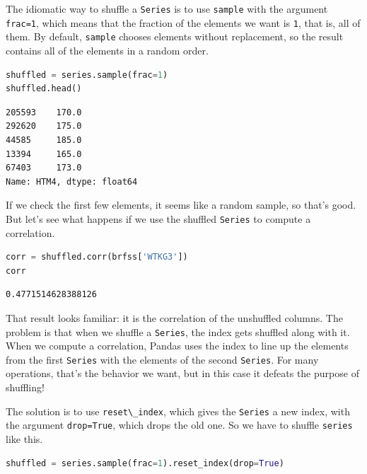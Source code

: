 The idiomatic way to shuffle a \passthrough{\lstinline!Series!} is to
use \passthrough{\lstinline!sample!} with the argument
\passthrough{\lstinline!frac=1!}, which means that the fraction of the
elements we want is \passthrough{\lstinline!1!}, that is, all of them.
By default, \passthrough{\lstinline!sample!} chooses elements without
replacement, so the result contains all of the elements in a random
order.

\begin{lstlisting}[language=Python,style=source]
shuffled = series.sample(frac=1)
shuffled.head()
\end{lstlisting}

\begin{lstlisting}[style=output]
205593    170.0
292620    175.0
44585     185.0
13394     165.0
67403     173.0
Name: HTM4, dtype: float64
\end{lstlisting}

If we check the first few elements, it seems like a random sample, so
that's good. But let's see what happens if we use the shuffled
\passthrough{\lstinline!Series!} to compute a correlation.

\begin{lstlisting}[language=Python,style=source]
corr = shuffled.corr(brfss['WTKG3'])
corr
\end{lstlisting}

\begin{lstlisting}[style=output]
0.4771514628388126
\end{lstlisting}

That result looks familiar: it is the correlation of the unshuffled
columns. The problem is that when we shuffle a
\passthrough{\lstinline!Series!}, the index gets shuffled along with it.
When we compute a correlation, Pandas uses the index to line up the
elements from the first \passthrough{\lstinline!Series!} with the
elements of the second \passthrough{\lstinline!Series!}. For many
operations, that's the behavior we want, but in this case it defeats the
purpose of shuffling!

The solution is to use \passthrough{\lstinline!reset\_index!}, which
gives the \passthrough{\lstinline!Series!} a new index, with the
argument \passthrough{\lstinline!drop=True!}, which drops the old one.
So we have to shuffle \passthrough{\lstinline!series!} like this.

\begin{lstlisting}[language=Python,style=source]
shuffled = series.sample(frac=1).reset_index(drop=True)
\end{lstlisting}

